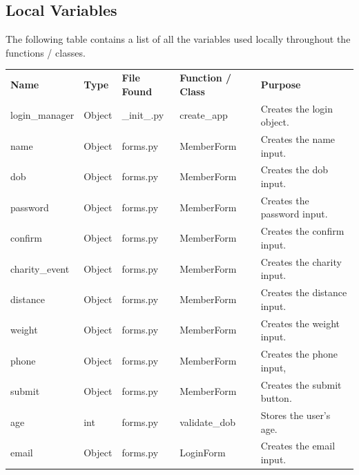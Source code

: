\documentclass{article}[12pt,a4paper]
\begin{document}
\subsection{Local Variables}
The following table contains a list of all the variables used locally throughout the functions / classes.
\begin{table}[h]
\begin{tabular}{lllll}
\textbf{Name}     & \textbf{Type} & \textbf{File Found} & \textbf{Function / Class} & \textbf{Purpose}                        \\
login\_manager    & Object        & \_init\_.py         & create\_app             & Creates the login object.               \\ \hline
name              & Object        & forms.py            & MemberForm              & Creates the name input.                 \\ \hline
dob               & Object        & forms.py            & MemberForm              & Creates the dob input.                  \\ \hline
password          & Object        & forms.py            & MemberForm              & Creates the password input.             \\ \hline
confirm           & Object        & forms.py            & MemberForm              & Creates the confirm input.              \\ \hline
charity\_event    & Object        & forms.py            & MemberForm              & Creates the charity input.              \\ \hline
distance          & Object        & forms.py            & MemberForm              & Creates the distance input.             \\ \hline
weight            & Object        & forms.py            & MemberForm              & Creates the weight input.               \\ \hline
phone             & Object        & forms.py            & MemberForm              & Creates the phone input,                \\ \hline
submit            & Object        & forms.py            & MemberForm              & Creates the submit button.              \\ \hline
age               & int           & forms.py            & validate\_dob           & Stores the user's age.                  \\ \hline
email             & Object        & forms.py            & LoginForm               & Creates the email input.                \\ \hline

\end{tabular}
\end{table}
\end{document}
